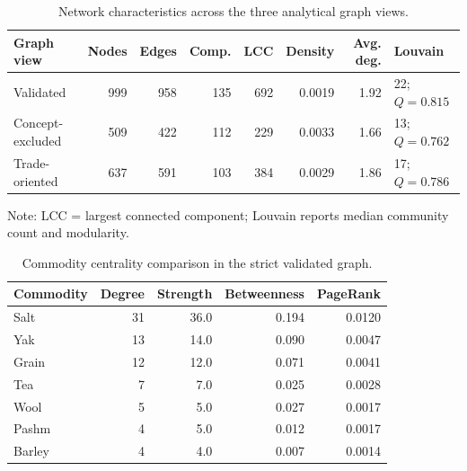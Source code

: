 \begin{table}[htbp]
\centering
\caption{Network characteristics across the three analytical graph views.}
\label{tab:network-characteristics}
\small
\begin{tabular}{lrrrrrrl}
\hline
Graph view & Nodes & Edges & Comp. & LCC & Density & Avg. deg. & Louvain \\
\hline
Validated & 999 & 958 & 135 & 692 & 0.0019 & 1.92 & 22; $Q=0.815$ \\
Concept-excluded & 509 & 422 & 112 & 229 & 0.0033 & 1.66 & 13; $Q=0.762$ \\
Trade-oriented & 637 & 591 & 103 & 384 & 0.0029 & 1.86 & 17; $Q=0.786$ \\
\hline
\end{tabular}
\begin{flushleft}
\footnotesize Note: LCC = largest connected component; Louvain reports median community count and modularity.
\end{flushleft}
\end{table}

\begin{table}[htbp]
\centering
\caption{Commodity centrality comparison in the strict validated graph.}
\label{tab:commodity-centrality}
\small
\begin{tabular}{lrrrr}
\hline
Commodity & Degree & Strength & Betweenness & PageRank \\
\hline
Salt & 31 & 36.0 & 0.194 & 0.0120 \\
Yak & 13 & 14.0 & 0.090 & 0.0047 \\
Grain & 12 & 12.0 & 0.071 & 0.0041 \\
Tea & 7 & 7.0 & 0.025 & 0.0028 \\
Wool & 5 & 5.0 & 0.027 & 0.0017 \\
Pashm & 4 & 5.0 & 0.012 & 0.0017 \\
Barley & 4 & 4.0 & 0.007 & 0.0014 \\
\hline
\end{tabular}
\end{table}
